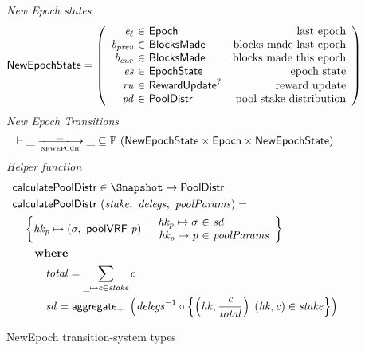 \begin{figure}
  \emph{New Epoch states}
  \begin{equation*}
    \NewEpochState =
    \left(
      \begin{array}{r@{~\in~}lr}
        \var{e_\ell} & \Epoch & \text{last epoch} \\
        \var{b_{prev}} & \BlocksMade & \text{blocks made last epoch} \\
        \var{b_{cur}} & \BlocksMade & \text{blocks made this epoch} \\
        \var{es} & \EpochState & \text{epoch state} \\
        \var{ru} & \RewardUpdate^? & \text{reward update} \\
        \var{pd} & \PoolDistr & \text{pool stake distribution} \\
      \end{array}
    \right)
  \end{equation*}
  \emph{New Epoch Transitions}
  \begin{equation*}
    \vdash \var{\_} \trans{newepoch}{\_} \var{\_} \subseteq
    \powerset (\NewEpochState \times \Epoch \times \NewEpochState)
  \end{equation*}
  \emph{Helper function}
  \begin{align*}
      & \fun{calculatePoolDistr} \in \Snapshot \to \PoolDistr \\
      & \fun{calculatePoolDistr}~(\var{stake},~\var{delegs},~\var{poolParams}) = \\
      & ~~~\left\{\var{hk_p}\mapsto(\sigma,~\fun{poolVRF}~\var{p})
            ~\Big\vert~
            {
              \begin{array}{r@{~\in~}l}
                \var{hk_p}\mapsto\sigma & \var{sd} \\
                \var{hk_p}\mapsto\var{p} & \var{poolParams}
              \end{array}
            }
            \right\}\\
      & ~~~~\where \\
      & ~~~~~~~~~\var{total} = \sum_{\_ \mapsto c\in\var{stake}} c \\
      & ~~~~~~~~~\var{sd} = \fun{aggregate_{+}}~\left(\var{delegs}^{-1}\circ
                     \left\{\left(
                       \var{hk}, \frac{\var{c}}{\var{total}}
                     \right) \vert (\var{hk},
                     \var{c}) \in \var{stake}
                     \right\}\right) \\
  \end{align*}

  \caption{NewEpoch transition-system types}
  \label{fig:ts-types:newepoch}
\end{figure}


